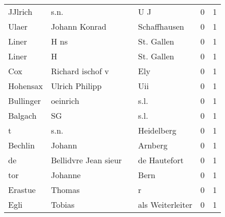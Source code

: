 \begin{center}
\begin{tiny}
\begin{longtabu}{llllrr}
                  JJlrich &                               s.n. &             &                                         U J &          0 &         1 \\
                    Ulaer &                      Johann Konrad &             &                                Schaffhausen &          0 &         1 \\
                    Liner &                               H ns &             &                                  St. Gallen &          0 &         1 \\
                    Liner &                                  H &             &                                  St. Gallen &          0 &         1 \\
                      Cox &                   Richard ischof v &             &                                         Ely &          0 &         1 \\
                 Hohensax &                     Ulrich Philipp &             &                                         Uii &          0 &         1 \\
                Bullinger &                           oeinrich &             &                                        s.l. &          0 &         1 \\
                  Balgach &                                 SG &             &                                        s.l. &          0 &         1 \\
                        t &                               s.n. &             &                                  Heidelberg &          0 &         1 \\
                  Bechlin &                             Johann &             &                                     Arnberg &          0 &         1 \\
                       de &               Bellidvre Jean sieur &             &                                de Hautefort &          0 &         1 \\
                      tor &                            Johanne &             &                                        Bern &          0 &         1 \\
                  Erastue &                             Thomas &             &                                           r &          0 &         1 \\
                     Egli &                             Tobias &             &                            als Weiterleiter &          0 &         1 \\

\end{longtabu}
\end{tiny}
\end{center}
